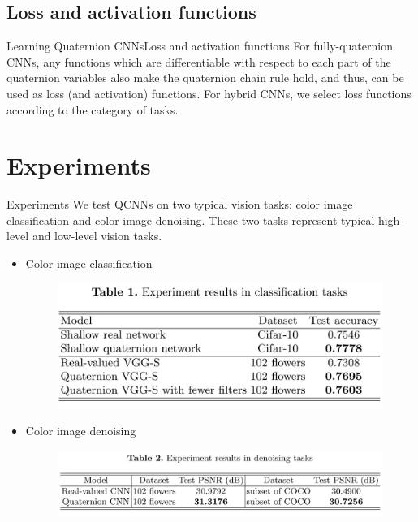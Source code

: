 \documentclass{beamer}
\begin{document}
\subsection{Loss and activation functions}
\begin{frame}{Learning Quaternion CNNs}{Loss and activation functions}
For fully-quaternion CNNs, any functions which are differentiable with respect to each part of the quaternion variables also make the quaternion chain rule hold, and thus, can be used as loss (and activation) functions. For hybrid CNNs, we select loss functions according to the category of tasks.
\end{frame}
\section{Experiments}
\begin{frame}{Experiments}
We test QCNNs on two typical vision tasks: color image classification and color image denoising. These two tasks represent typical high-level and low-level vision tasks.
\begin{itemize}
    \item Color image classification
    \begin{figure}[H]
        \centering
        \includegraphics[width=.5\textwidth]{img/pic3.jpg}
    \end{figure}
    \item Color image denoising
    \begin{figure}[H]
        \centering
        \includegraphics[width=.7\textwidth]{img/pic.jpg}
    \end{figure}
\end{itemize}
\end{frame}


\end{document}
